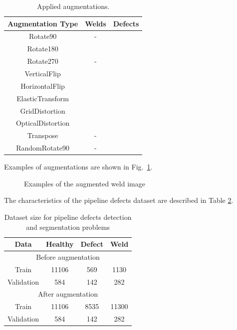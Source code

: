 \begin{table}[!htb]
	\caption{Applied augmentations.}
	\begin{center}
		\small
		\begin{tabular}{| c | c | c |}
			\hline
			Augmentation Type & Welds & Defects \\
			\hline
			Rotate90 &  - & \checkmark \\
			Rotate180 & \checkmark & \checkmark \\
			Rotate270 &  - & \checkmark \\
			VerticalFlip & \checkmark & \checkmark \\
			HorizontalFlip & \checkmark & \checkmark \\
			ElasticTransform & \checkmark & \checkmark \\
			GridDistortion & \checkmark & \checkmark \\
			OpticalDistortion & \checkmark & \checkmark \\
			Transpose & - & \checkmark \\
			RandomRotate90 &  - & \checkmark \\
			\hline
		\end{tabular}
		\label{tab:aug}
	\end{center}
\end{table}

Examples of augmentations are shown in Fig.~\ref{ris:aug_example}.
\begin{figure}[ht]
	\caption{Examples of the augmented weld image}
	\label{ris:aug_example}
\end{figure}


The characteristics of the pipeline defects dataset are described in Table \ref{tab:alg1}.
\begin{table}[!htb]
	\caption{\label{tab:alg1}Dataset size for pipeline defects detection and segmentation problems}
	\begin{center}
		\small
		\begin{tabular}{| c | c  c  c |}
			\hline
			Data & Healthy & Defect & Weld \\
			\hline
			\multicolumn{4}{|c|}{Before augmentation}  \\
			\hline
			Train  & 11106 & 569 & 1130 \\
			Validation & 584 & 142 & 282 \\
			\hline
			\multicolumn{4}{|c|}{After augmentation}  \\
			\hline
			Train  & 11106 & 8535 & 11300 \\
			Validation & 584 & 142 & 282 \\
			\hline
		\end{tabular}
	\end{center}
\end{table}

